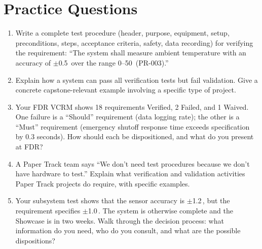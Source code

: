 \section{Practice Questions}
\begin{enumerate}[leftmargin=1.5em]
\item Write a complete test procedure (header, purpose, equipment, setup, preconditions, steps, acceptance criteria, safety, data recording) for verifying the requirement: ``The system shall measure ambient temperature with an accuracy of $\pm$0.5\,\degC{} over the range 0--50\,\degC{} (PR-003).''
\item Explain how a system can pass all verification tests but fail validation. Give a concrete capstone-relevant example involving a specific type of project.
\item Your FDR VCRM shows 18 requirements Verified, 2 Failed, and 1 Waived. One failure is a ``Should'' requirement (data logging rate); the other is a ``Must'' requirement (emergency shutoff response time exceeds specification by 0.3 seconds). How should each be dispositioned, and what do you present at FDR?
\item A Paper Track team says ``We don't need test procedures because we don't have hardware to test.'' Explain what verification and validation activities Paper Track projects do require, with specific examples.
\item Your subsystem test shows that the sensor accuracy is $\pm$1.2\,\degC{}, but the requirement specifies $\pm$1.0\,\degC{}. The system is otherwise complete and the Showcase is in two weeks. Walk through the decision process: what information do you need, who do you consult, and what are the possible dispositions?
\end{enumerate}


